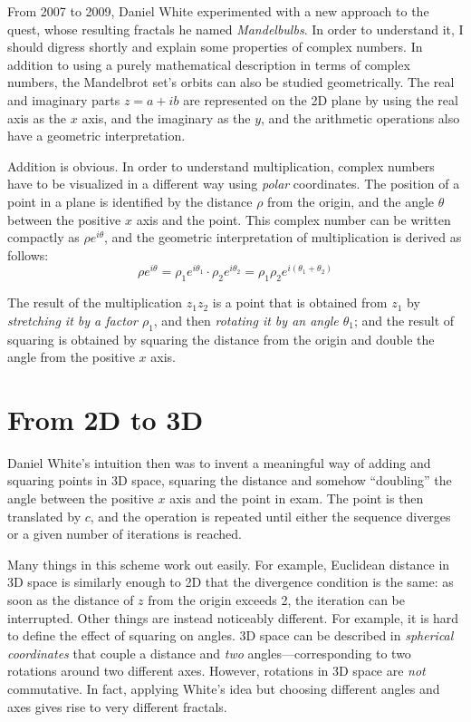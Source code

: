 \documentclass{article}
\begin{document}
From 2007 to 2009, Daniel White experimented with a new approach to
the quest, whose resulting fractals he named \emph{Mandelbulbs}.  In
order to understand it, I should digress shortly and explain some
properties of complex numbers.  In addition to using a purely
mathematical description in terms of complex numbers, the Mandelbrot
set's orbits can also be studied geometrically.  The real and
imaginary parts $z=a+ib$ are represented on the 2D plane by using the
real axis as the $x$ axis, and the imaginary as the $y$, and the
arithmetic operations also have a geometric interpretation.

Addition is obvious.  In order to understand multiplication, complex
numbers have to be visualized in a different way using \emph{polar}
coordinates.  The position of a point in a plane is identified by the
distance $\rho$ from the origin, and the angle $\theta$ between the
positive $x$ axis and the point.  This complex number can be written
compactly as $\rho e^{i \theta}$, and the geometric interpretation
of multiplication is derived as follows:
\begin{equation*}
  \rho e^{i \theta} =  \rho_1 e^{i \theta_1} \cdot \rho_2 e^{i \theta_2}
    = \rho_1\rho_2 e^{i (\theta_1 + \theta_2)}
\end{equation*}
  
\noindent
The result of the multiplication $z_1 z_2$ is a point that is obtained
from $z_1$ by \emph{stretching it by a factor $\rho_1$}, and
then \emph{rotating it by an angle $\theta_1$}; and the result of
squaring is obtained by squaring the distance from the origin and
double the angle from the positive $x$ axis.

\section{From 2D to 3D}

Daniel White's intuition then was to invent a meaningful way of adding
and squaring points in 3D space, squaring the distance and somehow
``doubling'' the angle between the positive $x$ axis and the point in
exam.  The point is then translated by $c$, and the operation is
repeated until either the sequence diverges or a given number of
iterations is reached.

Many things in this scheme work out easily.  For example, Euclidean
distance in 3D space is similarly enough to 2D that the divergence
condition is the same: as soon as the distance of $z$ from the origin
exceeds 2, the iteration can be interrupted.  Other things are instead
noticeably different.  For example, it is hard to define the effect of
squaring on angles.  3D space can be described in \emph{spherical
  coordinates} that couple a distance and \emph{two}
angles---corresponding to two rotations around two different axes.
However, rotations in 3D space are \emph{not} commutative.  In fact,
applying White's idea but choosing different angles and axes gives
rise to very different fractals.
\end{document}
